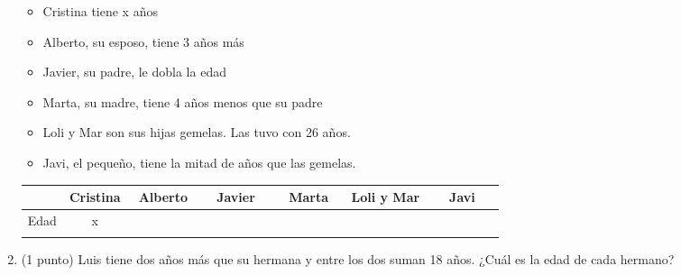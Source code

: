\documentclass[a4paper,12pt]{extarticle}
\begin{document}
\begin{enumerate}
        \begin{itemize}
            \item Cristina tiene x años
            \item Alberto, su esposo, tiene 3 años más 
            \item Javier, su padre, le dobla la edad
            \item Marta, su madre, tiene 4 años menos que su padre
            \item Loli y Mar son sus hijas gemelas. Las tuvo con 26 años.
            \item Javi, el pequeño, tiene la mitad de años que las gemelas.
        \end{itemize} 
        \begin{tabular}{| c | c | c | c | c | c | c | }
                \hline
                & Cristina & Alberto & Javier & Marta & Loli y Mar &  Javi \\ \hline
                Edad & x & $ \hspace{2cm}$  & $ \hspace{2cm}$ & $ \hspace{2cm}$  &$ \hspace{2cm}$ &  $ \hspace{2cm}$\\ 
                &  &  &  &   & &  \\ 
                \hline
            \end{tabular}
        \item (1 punto) Luis tiene dos años más que su hermana y entre los dos suman 18 años. ¿Cuál es la edad de cada hermano? 

    \end{enumerate}
\end{document}
